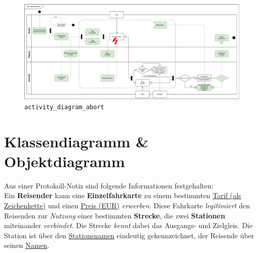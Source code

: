 \documentclass{article}
\begin{document}
\begin{enumerate}[label=\alph*.]
\begin{displayquote}
                \begin{figure}[ht]
                    \includegraphics[width=\textwidth]{swt_wende_tim_h04_activity_diagram_abort.pdf}
                    \caption{\texttt{activity\_diagram\_abort}}
                \end{figure}
            \end{displayquote}

    \end{enumerate}
    
    \newpage
    \section{Klassendiagramm \& Objektdiagramm}
    Aus einer Protokoll-Notiz sind folgende Informationen festgehalten:\\
    Ein \textbf{Reisender} kann eine \textbf{Einzelfahrkarte} zu einem bestimmten \underline{Tarif (als Zeichenkette)} und einen \underline{Preis (EUR)} \emph{erwerben}.
    Diese Fahrkarte \emph{legitimiert} den Reisenden zur \emph{Nutzung} einer bestimmten \textbf{Strecke}, die zwei \textbf{Stationen} miteinander \emph{verbindet}.
    Die Strecke \emph{kennt} dabei das Ausgangs- und Zielgleis.
    Die Station ist über den \underline{Stationsnamen} eindeutig gekennzeichnet, der Reisende über seinen \underline{Namen}.
\end{document}

